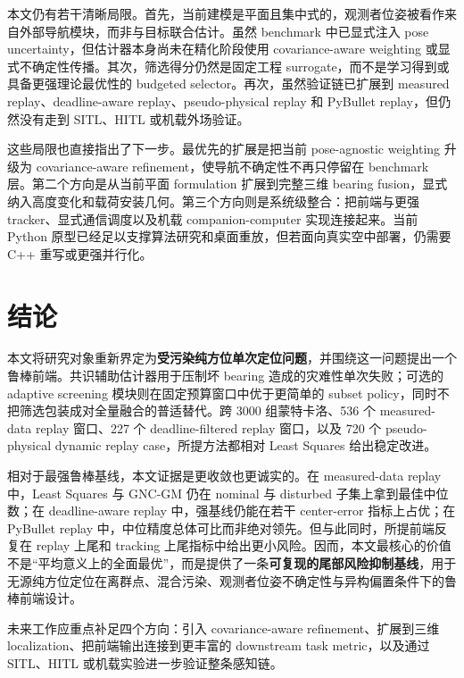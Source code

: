 \documentclass[drones,article,submit,moreauthors]{Definitions/mdpi}
\begin{document}
本文仍有若干清晰局限。首先，当前建模是平面且集中式的，观测者位姿被看作来自外部导航模块，而非与目标联合估计。虽然 benchmark 中已显式注入 pose uncertainty，但估计器本身尚未在精化阶段使用 covariance-aware weighting 或显式不确定性传播。其次，筛选得分仍然是固定工程 surrogate，而不是学习得到或具备更强理论最优性的 budgeted selector。再次，虽然验证链已扩展到 measured replay、deadline-aware replay、pseudo-physical replay 和 PyBullet replay，但仍然没有走到 SITL、HITL 或机载外场验证。

这些局限也直接指出了下一步。最优先的扩展是把当前 pose-agnostic weighting 升级为 covariance-aware refinement，使导航不确定性不再只停留在 benchmark 层。第二个方向是从当前平面 formulation 扩展到完整三维 bearing fusion，显式纳入高度变化和载荷安装几何。第三个方向则是系统级整合：把前端与更强 tracker、显式通信调度以及机载 companion-computer 实现连接起来。当前 Python 原型已经足以支撑算法研究和桌面重放，但若面向真实空中部署，仍需要 C++ 重写或更强并行化。

\section{结论}

本文将研究对象重新界定为\textbf{受污染纯方位单次定位问题}，并围绕这一问题提出一个鲁棒前端。共识辅助估计器用于压制坏 bearing 造成的灾难性单次失败；可选的 adaptive screening 模块则在固定预算窗口中优于更简单的 subset policy，同时不把筛选包装成对全量融合的普适替代。跨 3000 组蒙特卡洛、536 个 measured-data replay 窗口、227 个 deadline-filtered replay 窗口，以及 720 个 pseudo-physical dynamic replay case，所提方法都相对 Least Squares 给出稳定改进。

相对于最强鲁棒基线，本文证据是更收敛也更诚实的。在 measured-data replay 中，Least Squares 与 GNC-GM 仍在 nominal 与 disturbed 子集上拿到最佳中位数；在 deadline-aware replay 中，强基线仍能在若干 center-error 指标上占优；在 PyBullet replay 中，中位精度总体可比而非绝对领先。但与此同时，所提前端反复在 replay 上尾和 tracking 上尾指标中给出更小风险。因而，本文最核心的价值不是“平均意义上的全面最优”，而是提供了一条\textbf{可复现的尾部风险抑制基线}，用于无源纯方位定位在离群点、混合污染、观测者位姿不确定性与异构偏置条件下的鲁棒前端设计。

未来工作应重点补足四个方向：引入 covariance-aware refinement、扩展到三维 localization、把前端输出连接到更丰富的 downstream task metric，以及通过 SITL、HITL 或机载实验进一步验证整条感知链。

\appendix

\clearpage
\end{document}

